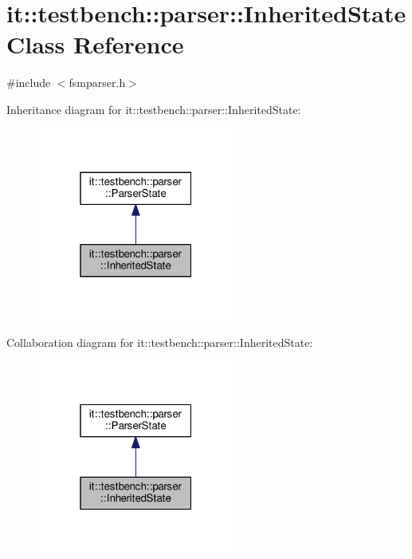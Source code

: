 \hypertarget{classit_1_1testbench_1_1parser_1_1InheritedState}{\section{it\-:\-:testbench\-:\-:parser\-:\-:Inherited\-State Class Reference}
\label{d9/d7d/classit_1_1testbench_1_1parser_1_1InheritedState}
}


{\ttfamily \#include $<$fsmparser.\-h$>$}



Inheritance diagram for it\-:\-:testbench\-:\-:parser\-:\-:Inherited\-State\-:
\nopagebreak
\begin{figure}[H]
\begin{center}
\leavevmode
\includegraphics[width=184pt]{d7/dfb/classit_1_1testbench_1_1parser_1_1InheritedState__inherit__graph}
\end{center}
\end{figure}


Collaboration diagram for it\-:\-:testbench\-:\-:parser\-:\-:Inherited\-State\-:
\nopagebreak
\begin{figure}[H]
\begin{center}
\leavevmode
\includegraphics[width=184pt]{d5/da0/classit_1_1testbench_1_1parser_1_1InheritedState__coll__graph}
\end{center}
\end{figure}
